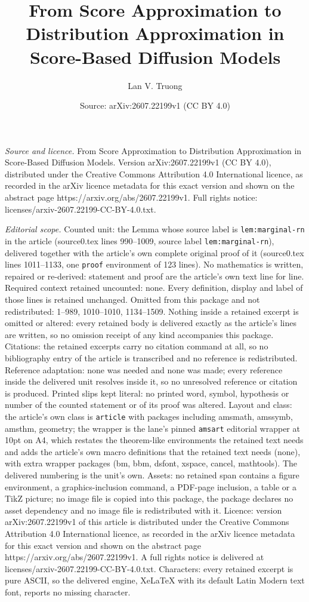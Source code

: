 \documentclass[10pt,a4paper]{amsart}
\title[From Score Approximation to Distribution Approximation in Sc]{From Score Approximation to Distribution Approximation in Score-Based Diffusion Models}
\author{Lan V. Truong}
\date{Source: arXiv:2607.22199v1 (CC BY 4.0)}
\begin{document}
\maketitle

\noindent\emph{Source and licence.} From Score Approximation to Distribution Approximation in Score-Based Diffusion Models. Version arXiv:2607.22199v1 (CC BY 4.0), distributed under the Creative Commons Attribution 4.0 International licence, as recorded in the arXiv licence metadata for this exact version and shown on the abstract page https://arxiv.org/abs/2607.22199v1. Full rights notice: licenses/arxiv-2607.22199-CC-BY-4.0.txt.\par\smallskip

\noindent\textit{Editorial scope.} Counted unit: the Lemma whose source label is \texttt{lem:marginal-rn} in the article (source0.tex lines 990--1009, source label \texttt{lem:marginal-rn}), delivered together with the article's own complete original proof of it (source0.tex lines 1011--1133, one \texttt{proof} environment of 123 lines). No mathematics is written, repaired or re-derived: statement and proof are the article's own text line for line. Required context retained uncounted: none. Every definition, display and label of those lines is retained unchanged. Omitted from this package and not redistributed: 1--989, 1010--1010, 1134--1509. Nothing inside a retained excerpt is omitted or altered: every retained body is delivered exactly as the article's lines are written, so no omission receipt of any kind accompanies this package. Citations: the retained excerpts carry no citation command at all, so no bibliography entry of the article is transcribed and no reference is redistributed. Reference adaptation: none was needed and none was made; every reference inside the delivered unit resolves inside it, so no unresolved reference or citation is produced. Printed slips kept literal: no printed word, symbol, hypothesis or number of the counted statement or of its proof was altered. Layout and class: the article's own class is \texttt{article} with packages including amsmath, amssymb, amsthm, geometry; the wrapper is the lane's pinned \texttt{amsart} editorial wrapper at 10pt on A4, which restates the theorem-like environments the retained text needs and adds the article's own macro definitions that the retained text needs (none), with extra wrapper packages (bm, bbm, dsfont, xspace, cancel, mathtools). The delivered numbering is the unit's own. Assets: no retained span contains a figure environment, a graphics-inclusion command, a PDF-page inclusion, a table or a TikZ picture; no image file is copied into this package, the package declares no asset dependency and no image file is redistributed with it. Licence: version arXiv:2607.22199v1 of this article is distributed under the Creative Commons Attribution 4.0 International licence, as recorded in the arXiv licence metadata for this exact version and shown on the abstract page https://arxiv.org/abs/2607.22199v1. A full rights notice is delivered at licenses/arxiv-2607.22199-CC-BY-4.0.txt. Characters: every retained excerpt is pure ASCII, so the delivered engine, XeLaTeX with its default Latin Modern text font, reports no missing character.
\end{document}
